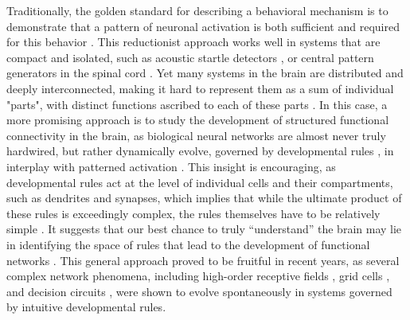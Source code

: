 \documentclass{article}
\begin{document}
Traditionally, the golden standard for describing a behavioral mechanism is to demonstrate that a pattern of neuronal activation is both sufficient and required for this behavior \citep{krakauer2017reductionist}. This reductionist approach works well in systems that are compact and isolated, such as acoustic startle detectors \citep{korn2005mauthner}, or central pattern generators in the spinal cord \citep{roberts2010hatchling}. Yet many systems in the brain are distributed and deeply interconnected, making it hard to represent them as a sum of individual "parts", with distinct functions ascribed to each of these parts \citep{gao2015simplicity}. In this case, a more promising approach is to study the development of structured functional connectivity in the brain, as biological neural networks are almost never truly hardwired, but rather dynamically evolve, governed by developmental rules \citep{pietri2017emergence}, in interplay with patterned activation \citep{gao2015simplicity}. This insight is encouraging, as developmental rules act at the level of individual cells and their compartments, such as dendrites and synapses, which implies that while the ultimate product of these rules is exceedingly complex, the rules themselves have to be relatively simple \citep{bassett2018models}. It suggests that our best chance to truly “understand” the brain may lie in identifying the space of rules that lead to the development of functional networks \citep{linderman2017constrain}. This general approach proved to be fruitful in recent years, as several complex network phenomena, including high-order receptive fields \citep{bashivan2018neural}, grid cells \citep{banino2018grid}, and decision circuits \citep{haesemeyer2018convergent}, were shown to evolve spontaneously in systems governed by intuitive developmental rules. 
\end{document}
